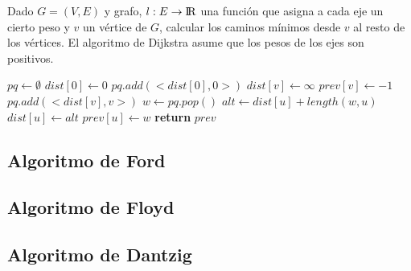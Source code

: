 Dado $G = (V, E)$ y grafo, $l: E \rightarrow {\rm I\!R}$ una funci\'on que asigna a cada eje un cierto peso y $v$ un v\'ertice de $G$, calcular los caminos m\'inimos desde $v$ al resto de los v\'ertices. El algoritmo de Dijkstra asume que los pesos de los ejes son positivos.

\begin{algorithm}
\begin{algorithmic}[1]
  \State $pq \gets \emptyset$
  \State $dist[0] \gets 0$
  \State $pq.add(<dist[0], 0>)$
    \State $dist[v] \gets \infty$
    \State $prev[v] \gets -1$
    \State $pq.add(<dist[v], v>)$
  \EndFor
    \State $w \gets pq.pop()$
      \State $alt \gets dist[u] + length(w, u)$
        \State $dist[u] \gets alt$
        \State $prev[u] \gets w$
      \EndIf
    \EndFor
  \EndWhile
  \State \textbf{return} $prev$
\EndFunction
\end{algorithmic}
\end{algorithm}

\newpage
\subsection{Algoritmo de Ford}
\newpage
\subsection{Algoritmo de Floyd}
\newpage
\subsection{Algoritmo de Dantzig}